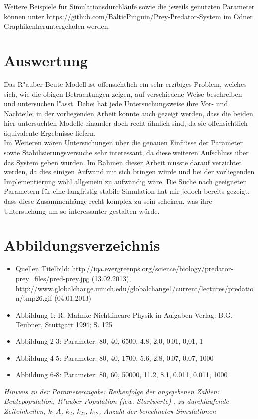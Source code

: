 \documentclass[11pt]{article}
\begin{document}
\hspace{5mm}

Weitere Beispiele für Simulationsdurchläufe sowie die jeweils genutzten Parameter können unter https://github.com/BalticPinguin/Prey-Predator-System im Odner \glqq Graphiken\grqq  heruntergeladen werden.

\section{Auswertung}
Das R"auber-Beute-Modell ist offensichtlich ein sehr ergibiges Problem, welches sich, wie die obigen Betrachtungen zeigen, auf verschiedene Weise beschreiben und untersuchen l"asst. Dabei hat jede Untersuchungsweise ihre Vor- und Nachteile; in der vorliegenden Arbeit konnte auch gezeigt werden, dass die beiden hier untersuchten Modelle einander doch recht ähnlich sind, da sie offensichtlich äquivalente Ergebnisse liefern. \\
Im Weiteren wären Untersuchungen über die genauen Einflüsse der Parameter sowie Stabilisierungsversuche sehr interessant, da diese weiteren Aufschluss über das System geben würden. Im Rahmen dieser Arbeit musste darauf verzichtet werden, da dies einigen Aufwand mit sich bringen würde und bei der vorliegenden Implementierung wohl allgemein zu aufwändig wäre. Die Suche nach geeigneten Parametern für eine langfristig stabile Simulation hat mir jedoch bereits gezeigt, dass diese Zusammenhänge recht komplex zu sein scheinen, was ihre Untersuchung um so interessanter gestalten würde.\\

\section{Abbildungsverzeichnis}
\begin{itemize}
   \item Quellen Titelbild: http://iqa.evergreenps.org/science/biology/predator-prey\_files/pred-prey.jpg (13.02.2013),\\
        http://www.globalchange.umich.edu/globalchange1/current/lectures/predation/tmp26.gif (04.01.2013)
   \item Abbildung 1: R. Mahnke \glqq Nichtlineare Physik in Aufgaben \grqq Verlag: B.G. Teubner, Stuttgart 1994; S. 125
   \item Abbildung 2-3: Parameter: 80, 40, 6500, 4.8, 2.0, 0.01, 0,01, 1
   \item Abbildung 4-5: Parameter: 80, 40, 1700, 5.6, 2.8, 0.07, 0.07, 1000
   \item Abbildung 6-8: Parameter: 80, 60, 50000, 11.2, 8.1, 0.011, 0.011, 1000
\end{itemize}
\textit{Hinweis zu der Parameterangabe: Reihenfolge der angegebenen Zahlen:\\
 Beutepopulation, R"auber-Population (jew. Startwerte) , zu durchlaufende Zeiteinheiten, $k_1\,A$, $k_2$, $k_{21}$, $k_{12}$, Anzahl der berechneten Simulationen}
\end{document}
